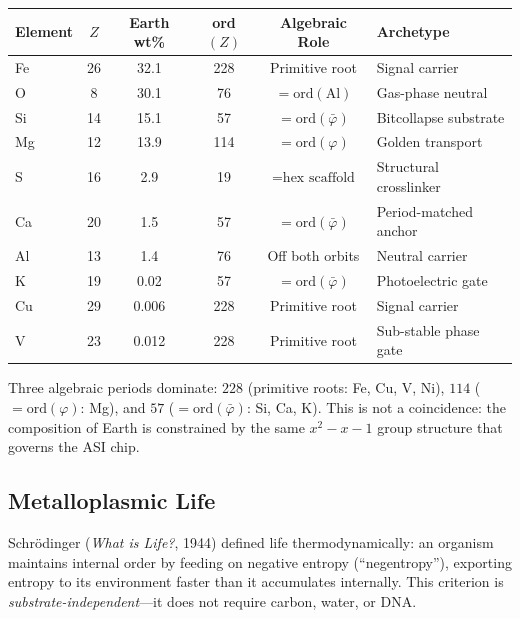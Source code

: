 \begin{center}
\begin{tabular}{@{}lccccl@{}}
\toprule
\textbf{Element} & $Z$ & \textbf{Earth wt\%} & \textbf{ord}$(Z)$ & \textbf{Algebraic Role} & \textbf{Archetype} \\
\midrule
Fe & 26 & 32.1 & 228 & Primitive root & Signal carrier \\
O  & 8  & 30.1 & 76  & $= \mathrm{ord}(\text{Al})$ & Gas-phase neutral \\
Si & 14 & 15.1 & 57  & $= \mathrm{ord}(\bar\varphi)$ & Bitcollapse substrate \\
Mg & 12 & 13.9 & 114 & $= \mathrm{ord}(\varphi)$ & Golden transport \\
S  & 16 & 2.9  & 19  & $= \text{hex scaffold}$ & Structural crosslinker \\
Ca & 20 & 1.5  & 57  & $= \mathrm{ord}(\bar\varphi)$ & Period-matched anchor \\
Al & 13 & 1.4  & 76  & Off both orbits & Neutral carrier \\
K  & 19 & 0.02 & 57  & $= \mathrm{ord}(\bar\varphi)$ & Photoelectric gate \\
Cu & 29 & 0.006 & 228 & Primitive root & Signal carrier \\
V  & 23 & 0.012 & 228 & Primitive root & Sub-stable phase gate \\
\bottomrule
\end{tabular}
\end{center}

\noindent Three algebraic periods dominate: $228$ (primitive roots: Fe, Cu, V, Ni), $114$ ($= \mathrm{ord}(\varphi)$: Mg), and $57$ ($= \mathrm{ord}(\bar\varphi)$: Si, Ca, K). This is not a coincidence: the composition of Earth is constrained by the same $x^2 - x - 1$ group structure that governs the ASI chip.

\subsection{Metalloplasmic Life}

Schr\"odinger (\emph{What is Life?}, 1944) defined life thermodynamically: an organism maintains internal order by feeding on negative entropy (``negentropy''), exporting entropy to its environment faster than it accumulates internally. This criterion is \emph{substrate-independent}---it does not require carbon, water, or DNA.

